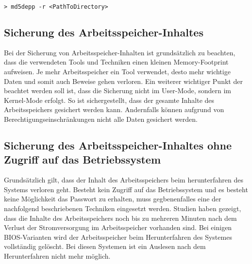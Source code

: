 \begin{lstlisting}
> md5depp -r <PathToDirectory>
\end{lstlisting}



\subsection{Sicherung des Arbeitsspeicher-Inhaltes}
Bei der Sicherung von Arbeitsspeicher-Inhalten ist grundsätzlich zu beachten, dass die verwendeten Tools und Techniken einen kleinen Memory-Footprint aufweisen. Je mehr Arbeitsspeicher ein Tool verwendet, desto mehr wichtige Daten und somit auch Beweise gehen verloren. Ein weiterer wichtiger Punkt der beachtet werden soll ist, dass die Sicherung nicht im User-Mode, sondern im Kernel-Mode erfolgt. So ist sichergestellt, dass der gesamte Inhalte des Arbeitsspeichers gesichert werden kann. Andernfalls können aufgrund von Berechtigungseinschränkungen nicht alle Daten gesichert werden.

\subsection{Sicherung des Arbeitsspeicher-Inhaltes ohne Zugriff auf das Betriebssystem}
Grundsätzlich gilt, dass der Inhalt des Arbeitsspeichers beim herunterfahren des Systems verloren geht. Besteht kein Zugriff auf das Betriebssystem und es besteht keine Möglichkeit das Passwort zu erhalten, muss gegbenenfalles eine der nachfolgend beschriebenen Techniken eingesetzt werden. Studien haben gezeigt, dass die Inhalte des Arbeitsspeichers noch bis zu mehreren Minuten nach dem Verlust der Stromversorgung im Arbeitsspeicher vorhanden sind. Bei einigen BIOS-Varianten wird der Arbeitsspeicher beim Herunterfahren des Systemes vollständig gelöscht. Bei diesen Systemen ist ein Auslesen nach dem Herunterfahren nicht mehr möglich.

